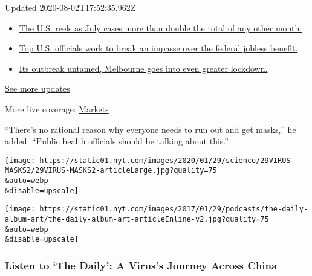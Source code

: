 Updated 2020-08-02T17:52:35.962Z

\begin{itemize}
\tightlist
\item
  \href{https://www.nytimes.com/2020/08/01/world/coronavirus-covid-19.html?action=click\&pgtype=Article\&state=default\&region=MAIN_CONTENT_1\&context=storylines_live_updates\#link-34047410}{The
  U.S. reels as July cases more than double the total of any other
  month.}
\item
  \href{https://www.nytimes.com/2020/08/01/world/coronavirus-covid-19.html?action=click\&pgtype=Article\&state=default\&region=MAIN_CONTENT_1\&context=storylines_live_updates\#link-780ec966}{Top
  U.S. officials work to break an impasse over the federal jobless
  benefit.}
\item
  \href{https://www.nytimes.com/2020/08/01/world/coronavirus-covid-19.html?action=click\&pgtype=Article\&state=default\&region=MAIN_CONTENT_1\&context=storylines_live_updates\#link-2bc8948}{Its
  outbreak untamed, Melbourne goes into even greater lockdown.}
\end{itemize}

\href{https://www.nytimes.com/2020/08/01/world/coronavirus-covid-19.html?action=click\&pgtype=Article\&state=default\&region=MAIN_CONTENT_1\&context=storylines_live_updates}{See
more updates}

More live coverage:
\href{https://www.nytimes.com/live/2020/07/31/business/stock-market-today-coronavirus?action=click\&pgtype=Article\&state=default\&region=MAIN_CONTENT_1\&context=storylines_live_updates}{Markets}

``There's no rational reason why everyone needs to run out and get
masks,'' he added. ``Public health officials should be talking about
this.''

\texttt{[image: https://static01.nyt.com/images/2020/01/29/science/29VIRUS-MASKS2/29VIRUS-MASKS2-articleLarge.jpg?quality=75\\\&auto=webp\\\&disable=upscale]}

\texttt{[image: https://static01.nyt.com/images/2017/01/29/podcasts/the-daily-album-art/the-daily-album-art-articleInline-v2.jpg?quality=75\\\&auto=webp\\\&disable=upscale]}

\hypertarget{listen-to-the-daily-a-viruss-journey-across-china}{%
\subsubsection{Listen to `The Daily': A Virus's Journey Across
China}\label{listen-to-the-daily-a-viruss-journey-across-china}}

